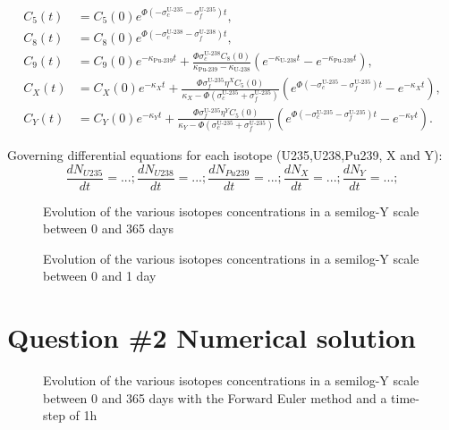 \documentclass[11pt,a4paper]{article}
\begin{document}
\[
\begin{aligned}
C_5(t) &= C_5(0) e^{\Phi \left(-\sigma_c^{\text{U-235}} - \sigma_f^{\text{U-235}}\right) t}, \\
C_8(t) &= C_8(0) e^{\Phi \left(-\sigma_c^{\text{U-238}} - \sigma_f^{\text{U-238}}\right) t}, \\
C_9(t) &= C_9(0) e^{-\kappa_{\text{Pu-239}} t} + \frac{\Phi \sigma_c^{\text{U-238}} C_8(0)}{\kappa_{\text{Pu-239}} - \kappa_{\text{U-238}}} \left(e^{-\kappa_{\text{U-238}} t} - e^{-\kappa_{\text{Pu-239}} t}\right), \\
C_X(t) &= C_X(0) e^{-\kappa_X t} + \frac{\Phi \sigma_f^{\text{U-235}} \eta^X C_5(0)}{\kappa_X - \Phi \left(\sigma_c^{\text{U-235}} + \sigma_f^{\text{U-235}}\right)} \left(e^{\Phi \left(-\sigma_c^{\text{U-235}} - \sigma_f^{\text{U-235}}\right) t} - e^{-\kappa_X t}\right), \\
C_Y(t) &= C_Y(0) e^{-\kappa_Y t} + \frac{\Phi \sigma_f^{\text{U-235}} \eta^Y C_5(0)}{\kappa_Y - \Phi \left(\sigma_c^{\text{U-235}} + \sigma_f^{\text{U-235}}\right)} \left(e^{\Phi \left(-\sigma_c^{\text{U-235}} - \sigma_f^{\text{U-235}}\right) t} - e^{-\kappa_Y t}\right).
\end{aligned}
\]

Governing differential equations for each isotope (U235,U238,Pu239, X and Y):
\begin{equation}
	\frac{dN_{U235}}{dt} = ...; 
	\frac{dN_{U238}}{dt} = ...; 
	\frac{dN_{Pu239}}{dt} = ...; 	
	\frac{dN_{X}}{dt} = ...; 
	\frac{dN_{Y}}{dt} = ...;	 
\end{equation}
\begin{figure}[h]
	\centering
	\caption{Evolution of the various isotopes concentrations in a semilog-Y scale between 0 and 365 days}
\end{figure}
\begin{figure}[h]
	\centering
	\caption{Evolution of the various isotopes concentrations in a semilog-Y scale between 0 and 1 day}
\end{figure}

\section{Question \#2 Numerical solution}
\begin{figure}[h]
	\centering
	\caption{Evolution of the various isotopes concentrations in a semilog-Y scale  between 0 and 365 days with the Forward Euler method and a time-step of 1h}
\end{figure}
\end{document}
